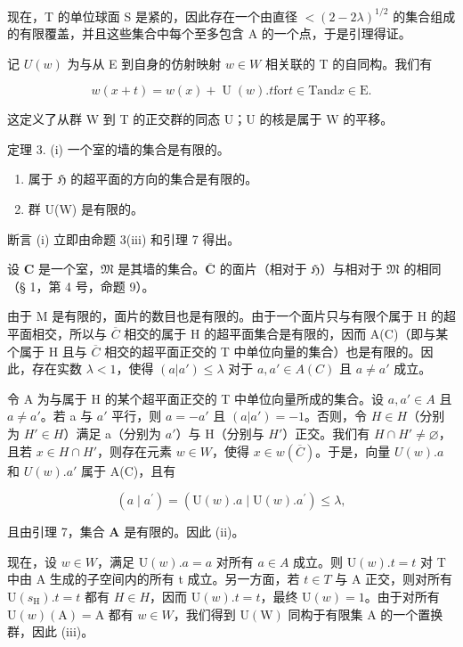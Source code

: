 现在，T 的单位球面 S 是紧的，因此存在一个由直径 \(<(2-2\lambda)^{1/2}\) 的集合组成的有限覆盖，并且这些集合中每个至多包含 A 的一个点，于是引理得证。

记 \(U(w)\) 为与从 E 到自身的仿射映射 \(w \in W\) 相关联的 T 的自同构。我们有

\[
w (x + t) = w (x) + \operatorname{U} (w). t \text {for} t \in \mathrm{T} \text {and} x \in \mathrm{E}.
\]

这定义了从群 W 到 T 的正交群的同态 U；U 的核是属于 W 的平移。

定理 3. (i) 一个室的墙的集合是有限的。

\begin{enumerate}
\def\labelenumi{(\roman{enumi})}
\setcounter{enumi}{1}
\item
属于 \(\mathfrak{H}\) 的超平面的方向的集合是有限的。
\item
群 U(W) 是有限的。
\end{enumerate}

断言 (i) 立即由命题 3(iii) 和引理 7 得出。

设 \(\mathbf{C}\) 是一个室，\(\mathfrak{M}\) 是其墙的集合。\(\overline{\mathbf{C}}\) 的面片（相对于 \(\mathfrak{H}\)）与相对于 \(\mathfrak{M}\) 的相同（§ 1，第 4 号，命题 9）。

由于 M 是有限的，面片的数目也是有限的。由于一个面片只与有限个属于 H 的超平面相交，所以与 \(\overline{C}\) 相交的属于 H 的超平面集合是有限的，因而 A(C)（即与某个属于 H 且与 \(\overline{C}\) 相交的超平面正交的 T 中单位向量的集合）也是有限的。因此，存在实数 \(\lambda < 1\)，使得 \((a|a') \leqslant \lambda\) 对于 \(a, a' \in A(C)\) 且 \(a \neq a'\) 成立。

令 A 为与属于 H 的某个超平面正交的 T 中单位向量所成的集合。设 \(a, a' \in A\) 且 \(a \neq a'\)。若 a 与 \(a'\) 平行，则 \(a = -a'\) 且 \((a|a') = -1\)。否则，令 \(H \in H\)（分别为 \(H' \in H\)）满足 a（分别为 \(a'\)）与 H（分别与 \(H'\)）正交。我们有 \(H \cap H' \neq \varnothing\)，且若 \(x \in H \cap H'\)，则存在元素 \(w \in W\)，使得 \(x \in w(\overline{C})\)。于是，向量 \(U(w).a\) 和 \(U(w).a'\) 属于 A(C)，且有

\[
(a \mid a ^ {\prime}) = (\mathrm{U} (w). a \mid \mathrm{U} (w). a ^ {\prime}) \leqslant \lambda ,
\]

且由引理 7，集合 \(\mathbf{A}\) 是有限的。因此 (ii)。

现在，设 \(w \in W\)，满足 \(\mathrm{U}(w).a = a\) 对所有 \(a \in A\) 成立。则 \(\mathrm{U}(w).t = t\) 对 T 中由 A 生成的子空间内的所有 t 成立。另一方面，若 \(t \in T\) 与 A 正交，则对所有 \(\mathrm{U}(s_{\mathrm{H}}).t = t\) 都有 \(H \in H\)，因而 \(\mathrm{U}(w).t = t\)，最终 \(\mathrm{U}(w) = 1\)。由于对所有 \(\mathrm{U}(w)(\mathrm{A}) = \mathrm{A}\) 都有 \(w \in W\)，我们得到 \(\mathrm{U}(\mathrm{W})\) 同构于有限集 A 的一个置换群，因此 (iii)。

